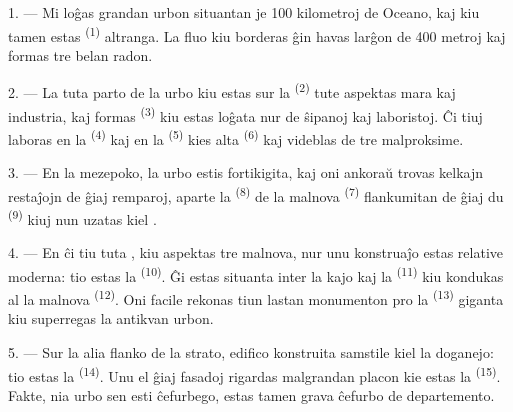 
\VUsaut{2.0mm}
\VUsaut{3.0mm}
\VUfilet{16mm}
\VUsaut{5.6mm}
\VUsaut{1.4mm}
\VUsaut{2.2mm}

\VUsaut{3.0mm}

1. --- Mi loĝas grandan urbon situantan je 100 kilometroj de Oceano, kaj kiu
tamen estas  \textsuperscript{(1)} altranga. La fluo kiu
borderas ĝin havas larĝon de 400 metroj kaj formas tre belan radon.

2. --- La tuta parto de la urbo kiu estas sur la 
\textsuperscript{(2)} tute aspektas mara kaj industria, kaj formas
 \textsuperscript{(3)} kiu estas loĝata nur de ŝipanoj kaj
laboristoj. Ĉi tiuj laboras en la  \textsuperscript{(4)} kaj
en la  \textsuperscript{(5)} kies alta 
\textsuperscript{(6)} kaj  videblas de tre malproksime.

3. --- En la mezepoko, la urbo estis fortikigita, kaj oni ankoraŭ trovas
kelkajn restaĵojn de ĝiaj remparoj, aparte la 
\textsuperscript{(8)} de la malnova 
\textsuperscript{(7)} flankumitan de ĝiaj du 
\textsuperscript{(9)} kiuj nun uzatas kiel .

4. --- En ĉi tiu tuta , kiu aspektas tre malnova, nur unu
konstruaĵo estas relative moderna: tio estas la 
\textsuperscript{(10)}. Ĝi estas situanta inter la kajo kaj la 
\textsuperscript{(11)} kiu kondukas al la malnova 
\textsuperscript{(12)}. Oni facile rekonas tiun lastan monumenton pro la
 \textsuperscript{(13)} giganta kiu superregas la antikvan
urbon.

5. --- Sur la alia flanko de la strato,  edifico konstruita
samstile kiel la doganejo: tio estas la  \textsuperscript{(14)}.
Unu el ĝiaj fasadoj rigardas malgrandan placon kie estas la
 \textsuperscript{(15)}. Fakte, nia urbo sen esti ĉefurbego,
estas tamen grava ĉefurbo de departemento.

